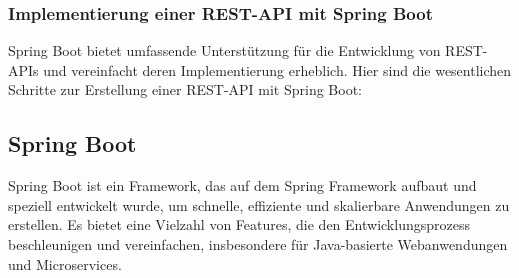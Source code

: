 \subsubsection{Implementierung einer REST-API mit Spring Boot}
Spring Boot bietet umfassende Unterstützung für die Entwicklung von REST-APIs und vereinfacht deren Implementierung erheblich. Hier sind die wesentlichen Schritte zur Erstellung einer REST-API mit Spring Boot:




\subsection{Spring Boot}

Spring Boot ist ein Framework, das auf dem Spring Framework aufbaut und speziell entwickelt wurde, um schnelle, effiziente und skalierbare Anwendungen zu erstellen. Es bietet eine Vielzahl von Features, die den Entwicklungsprozess beschleunigen und vereinfachen, insbesondere für Java-basierte Webanwendungen und Microservices.

